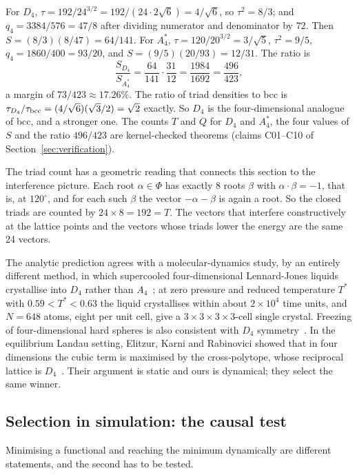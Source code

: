 \documentclass[a4paper,11pt]{article}
\numberwithin{equation}{section}
\theoremstyle{jsplain}
\theoremstyle{jsrem}
\begin{document}
For $D_4$, $\tau=192/24^{3/2}=192/(24\cdot2\sqrt6)=4/\sqrt6$, so $\tau^2=8/3$; and $q_4=3384/576=47/8$ after dividing numerator and denominator by $72$. Then $S=(8/3)(8/47)=64/141$. For $A_4^*$, $\tau=120/20^{3/2}=3/\sqrt5$, $\tau^2=9/5$, $q_4=1860/400=93/20$, and $S=(9/5)(20/93)=12/31$. The ratio is
\[
\frac{S_{D_4}}{S_{A_4^*}}=\frac{64}{141}\cdot\frac{31}{12}=\frac{1984}{1692}=\frac{496}{423},
\]
a margin of $73/423\approx17.26\%$. The ratio of triad densities to bcc is $\tau_{D_4}/\tau_{\rm bcc}=(4/\sqrt6)(\sqrt3/2)=\sqrt2$ exactly. So $D_4$ is the four-dimensional analogue of bcc, and a stronger one. The counts $T$ and $Q$ for $D_4$ and $A_4^*$, the four values of $S$ and the ratio $496/423$ are kernel-checked theorems (claims C01--C10 of Section~\ref{sec:verification}).

The triad count has a geometric reading that connects this section to the interference picture. Each root $\alpha\in\Phi$ has exactly $8$ roots $\beta$ with $\alpha\cdot\beta=-1$, that is, at $120^\circ$, and for each such $\beta$ the vector $-\alpha-\beta$ is again a root. So the closed triads are counted by $24\times8=192=T$. The vectors that interfere constructively at the lattice points and the vectors whose triads lower the energy are the same 24 vectors.

The analytic prediction agrees with a molecular-dynamics study, by an entirely different method, in which supercooled four-dimensional Lennard-Jones liquids crystallise into $D_4$ rather than $A_4$~\cite{ref40}; at zero pressure and reduced temperature $T^*$ with $0.59<T^*<0.63$ the liquid crystallises within about $2\times10^4$ time units, and $N=648$ atoms, eight per unit cell, give a $3\times3\times3\times3$-cell single crystal. Freezing of four-dimensional hard spheres is also consistent with $D_4$ symmetry~\cite{ref39}. In the equilibrium Landau setting, Elitzur, Karni and Rabinovici showed that in four dimensions the cubic term is maximised by the cross-polytope, whose reciprocal lattice is $D_4$~\cite{ref45}. Their argument is static and ours is dynamical; they select the same winner.

\subsection{Selection in simulation: the causal test}\label{sec:sim}

Minimising a functional and reaching the minimum dynamically are different statements, and the second has to be tested.
\end{document}
